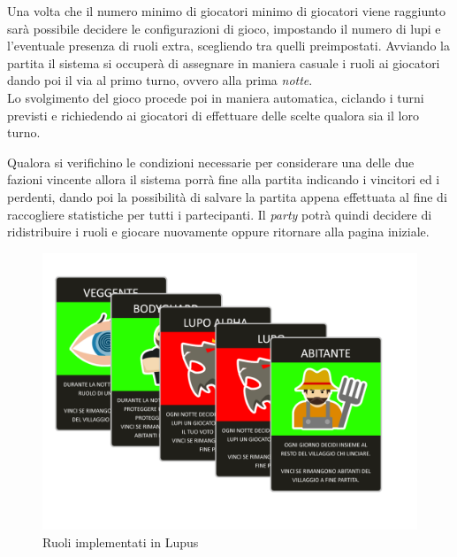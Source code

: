 Una volta che il numero minimo di giocatori minimo di giocatori viene raggiunto sarà possibile decidere le configurazioni di gioco, impostando il numero di lupi e l'eventuale presenza di ruoli extra, scegliendo tra quelli preimpostati.
Avviando la partita il sistema si occuperà di assegnare in maniera casuale i ruoli ai giocatori dando poi il via al primo turno, ovvero alla prima \emph{notte}.\\[\baselineskip]\indent
Lo svolgimento del gioco procede poi in maniera automatica, ciclando i turni previsti e richiedendo ai giocatori di effettuare delle scelte qualora sia il loro turno. 

Qualora si verifichino le condizioni necessarie per considerare una delle due fazioni vincente allora il sistema porrà fine alla partita indicando i vincitori ed i perdenti, dando poi la possibilità di salvare la partita appena effettuata al fine di raccogliere statistiche per tutti i partecipanti.
Il \emph{party} potrà quindi decidere di ridistribuire i ruoli e giocare nuovamente oppure ritornare alla pagina iniziale.

\begin{figure}[H]
\centering
\includegraphics[width=\textwidth]{img/cards.png}
\caption{Ruoli implementati in Lupus}
\label{fig:cards}
\end{figure}
